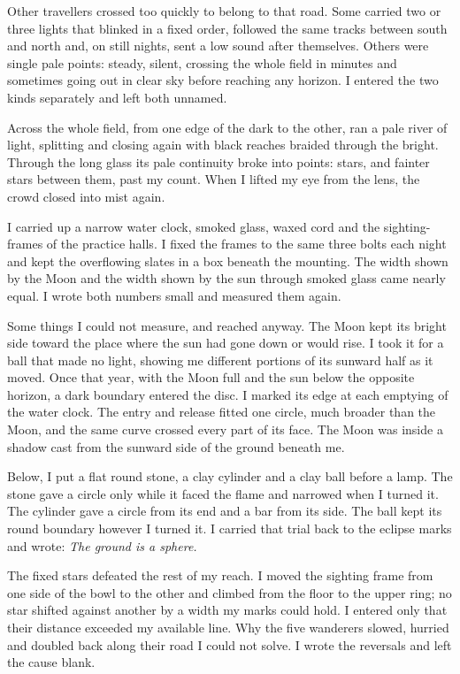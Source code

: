 Other travellers crossed too quickly to belong to that road. Some carried two or three lights that blinked in a fixed order, followed the same tracks between south and north and, on still nights, sent a low sound after themselves. Others were single pale points: steady, silent, crossing the whole field in minutes and sometimes going out in clear sky before reaching any horizon. I entered the two kinds separately and left both unnamed.\par

Across the whole field, from one edge of the dark to the other, ran a pale river of light, splitting and closing again with black reaches braided through the bright. Through the long glass its pale continuity broke into points: stars, and fainter stars between them, past my count. When I lifted my eye from the lens, the crowd closed into mist again.\par

I carried up a narrow water clock, smoked glass, waxed cord and the sighting-frames of the practice halls. I fixed the frames to the same three bolts each night and kept the overflowing slates in a box beneath the mounting. The width shown by the Moon and the width shown by the sun through smoked glass came nearly equal. I wrote both numbers small and measured them again.\par

Some things I could not measure, and reached anyway. The Moon kept its bright side toward the place where the sun had gone down or would rise. I took it for a ball that made no light, showing me different portions of its sunward half as it moved. Once that year, with the Moon full and the sun below the opposite horizon, a dark boundary entered the disc. I marked its edge at each emptying of the water clock. The entry and release fitted one circle, much broader than the Moon, and the same curve crossed every part of its face. The Moon was inside a shadow cast from the sunward side of the ground beneath me.\par

Below, I put a flat round stone, a clay cylinder and a clay ball before a lamp. The stone gave a circle only while it faced the flame and narrowed when I turned it. The cylinder gave a circle from its end and a bar from its side. The ball kept its round boundary however I turned it. I carried that trial back to the eclipse marks and wrote: \textit{The ground is a sphere.}\par

The fixed stars defeated the rest of my reach. I moved the sighting frame from one side of the bowl to the other and climbed from the floor to the upper ring; no star shifted against another by a width my marks could hold. I entered only that their distance exceeded my available line. Why the five wanderers slowed, hurried and doubled back along their road I could not solve. I wrote the reversals and left the cause blank.\par

